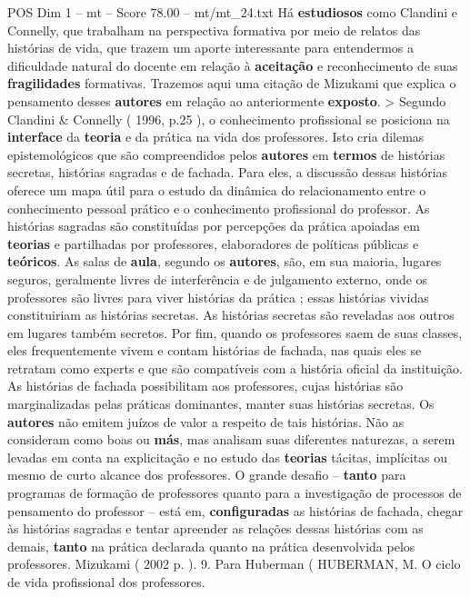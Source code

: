 \begin{textsample}{POS Dim 1 – mt – Score 78.00 – mt/mt\_24.txt}
Há \textbf{estudiosos} como Clandini e Connelly, que trabalham na perspectiva formativa por meio de relatos das histórias de vida, que trazem um aporte interessante para entendermos a dificuldade natural do docente em relação à \textbf{aceitação} e reconhecimento de suas \textbf{fragilidades} formativas.
Trazemos aqui uma citação de Mizukami que explica o pensamento desses \textbf{autores} em relação ao anteriormente \textbf{exposto}. > Segundo Clandini \& Connelly ( 1996, p.25 ), o conhecimento profissional se posiciona na \textbf{interface} da \textbf{teoria} e da prática na vida dos professores.
Isto cria dilemas epistemológicos que são compreendidos pelos \textbf{autores} em \textbf{termos} de histórias secretas, histórias sagradas e de fachada.
Para eles, a discussão dessas histórias oferece um mapa útil para o estudo da dinâmica do relacionamento entre o conhecimento pessoal prático e o conhecimento profissional do professor.
As histórias sagradas são constituídas por percepções da prática apoiadas em \textbf{teorias} e partilhadas por professores, elaboradores de políticas públicas e \textbf{teóricos}.
As salas de \textbf{aula}, segundo os \textbf{autores}, são, em sua maioria, lugares seguros, geralmente livres de interferência e de julgamento externo, onde os professores são livres para viver histórias da prática ; essas histórias vividas constituiriam as histórias secretas.
As histórias secretas são reveladas aos outros em lugares também secretos.
Por fim, quando os professores saem de suas classes, eles frequentemente vivem e contam histórias de fachada, nas quais eles se retratam como experts e que são compatíveis com a história oficial da instituição.
As histórias de fachada possibilitam aos professores, cujas histórias são marginalizadas pelas práticas dominantes, manter suas histórias secretas.
Os \textbf{autores} não emitem juízos de valor a respeito de tais histórias.
Não as consideram como boas ou \textbf{más}, mas analisam suas diferentes naturezas, a serem levadas em conta na explicitação e no estudo das \textbf{teorias} tácitas, implícitas ou mesmo de curto alcance dos professores.
O grande desafio – \textbf{tanto} para programas de formação de professores quanto para a investigação de processos de pensamento do professor – está em, \textbf{configuradas} as histórias de fachada, chegar às histórias sagradas e tentar apreender as relações dessas histórias com as demais, \textbf{tanto} na prática declarada quanto na prática desenvolvida pelos professores.
Mizukami ( 2002 p. ). 9.
Para Huberman ( HUBERMAN, M.
O ciclo de vida profissional dos professores.

\end{textsample}
